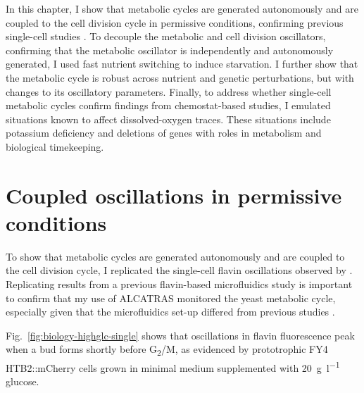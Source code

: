 In this chapter, I show that metabolic cycles are generated autonomously and are coupled to the cell division cycle in permissive conditions, confirming previous single-cell studies \parencite{papagiannakisAutonomousMetabolicOscillations2017,ozsezenInferenceHighLevelInteraction2019}.
To decouple the metabolic and cell division oscillators, confirming that the metabolic oscillator is independently and autonomously generated, I used fast nutrient switching to induce starvation.
I further show that the metabolic cycle is robust across nutrient and genetic perturbations, but with changes to its oscillatory parameters.
Finally, to address whether single-cell metabolic cycles confirm findings from chemostat-based studies, I emulated situations known to affect dissolved-oxygen traces.
These situations include potassium deficiency and deletions of genes with roles in metabolism and biological timekeeping.


\section{Coupled oscillations in permissive conditions}
\label{sec:biology-sync}

To show that metabolic cycles are generated autonomously and are coupled to the cell division cycle, I replicated the single-cell flavin oscillations observed by \textcite{baumgartnerFlavinbasedMetabolicCycles2018}.
Replicating results from a previous flavin-based microfluidics study is important to confirm that my use of ALCATRAS \parencite{craneMicrofluidicSystemStudying2014} monitored the yeast metabolic cycle, especially given that the microfluidics set-up differed from previous studies \parencite{papagiannakisAutonomousMetabolicOscillations2017, baumgartnerFlavinbasedMetabolicCycles2018}.

Fig.\ \ref{fig:biology-highglc-single} shows that oscillations in flavin fluorescence peak when a bud forms shortly before G\textsubscript{2}/M, as evidenced by prototrophic FY4 HTB2::mCherry cells grown in minimal medium supplemented with \SI{20}{\gram~\litre^{-1}} glucose.

